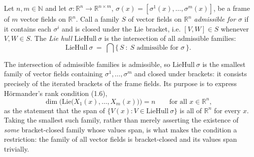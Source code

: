 \begin{definition}
Let $n,m\in\mathbb N$ and let
$\sigma:\mathbb R^n\to\mathbb R^{n\times m}$, $\sigma(x)=[\sigma^1(x),\ldots,\sigma^m(x)]$,
be a frame of $m$ vector fields on $\mathbb R^n$. Call a family $S$ of vector fields on
$\mathbb R^n$ \emph{admissible for $\sigma$} if it contains each $\sigma^i$ and is closed
under the Lie bracket, i.e. $[V,W]\in S$ whenever $V,W\in S$. The \emph{Lie hull}
$\mathrm{LieHull}\ \sigma$ is the intersection of all admissible families:
\[
 \mathrm{LieHull}\ \sigma\ =\ \bigcap\big\{\,S\ :\ S\text{ admissible for }\sigma\,\big\}.
\]

The intersection of admissible families is admissible, so $\mathrm{LieHull}\ \sigma$ is the
smallest family of vector fields containing $\sigma^1,\ldots,\sigma^m$ and closed under
brackets: it consists precisely of the iterated brackets of the frame fields. Its purpose
is to express H\"ormander's rank condition (1.6),
\[
 \dim\Big(\mathrm{Lie}\big(X_1(x),\ldots,X_m(x)\big)\Big)=n\qquad\text{for all }x\in\mathbb R^n,
\]
as the statement that the span of $\{V(x):V\in\mathrm{LieHull}\ \sigma\}$ is all of
$\mathbb R^n$ for every $x$. Taking the smallest such family, rather than merely asserting
the existence of \emph{some} bracket-closed family whose values span, is what makes the
condition a restriction: the family of all vector fields is bracket-closed and its values
span trivially.
\end{definition}
